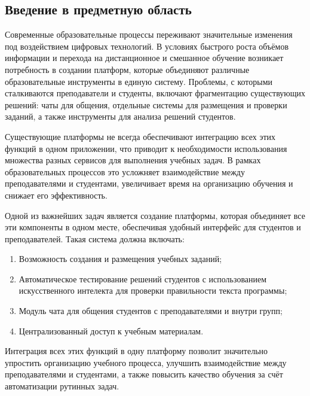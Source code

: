 \subsection{Введение в предметную область}

Современные образовательные процессы переживают значительные изменения под воздействием цифровых технологий. В условиях быстрого роста объёмов информации и перехода на дистанционное и смешанное обучение возникает потребность в создании платформ, которые объединяют различные образовательные инструменты в единую систему. Проблемы, с которыми сталкиваются преподаватели и студенты, включают фрагментацию существующих решений: чаты для общения, отдельные системы для размещения и проверки заданий, а также инструменты для анализа решений студентов.

Существующие платформы не всегда обеспечивают интеграцию всех этих функций в одном приложении, что приводит к необходимости использования множества разных сервисов для выполнения учебных задач. В рамках образовательных процессов это усложняет взаимодействие между преподавателями и студентами, увеличивает время на организацию обучения и снижает его эффективность.

Одной из важнейших задач является создание платформы, которая объединяет все эти компоненты в одном месте, обеспечивая удобный интерфейс для студентов и преподавателей. Такая система должна включать:
\begin{enumerate}
  \item Возможность создания и размещения учебных заданий;
  \item Автоматическое тестирование решений студентов с использованием искусственного интелекта для проверки правильности текста программы;
  \item Модуль чата для общения студентов с преподавателями и внутри групп;
  \item Централизованный доступ к учебным материалам.
\end{enumerate}

Интеграция всех этих функций в одну платформу позволит значительно упростить организацию учебного процесса, улучшить взаимодействие между преподавателями и студентами, а также повысить качество обучения за счёт автоматизации рутинных задач.
